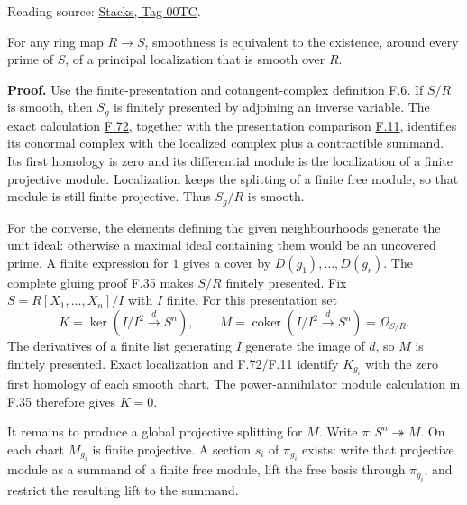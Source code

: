 \documentclass[11pt,a4paper,openany]{report}
\begin{document}
Reading source: \href{https://stacks.math.columbia.edu/tag/00TC}{Stacks, Tag 00TC}.

For any ring map \(R\to S\), smoothness is equivalent to the existence, around every prime of \(S\), of a principal localization that is smooth over \(R\).

\textbf{Proof.} Use the finite-presentation and cotangent-complex definition \hyperref[AG-RG-S05-algebra-definition-smooth]{F.6}. If \(S/R\) is smooth, then \(S_g\) is finitely presented by adjoining an inverse variable. The exact calculation \hyperref[AG-RG-S05-algebra-lemma-principal-localization-NL]{F.72}, together with the presentation comparison \hyperref[AG-RG-S05-algebra-lemma-NL-homotopy]{F.11}, identifies its conormal complex with the localized complex plus a contractible summand. Its first homology is zero and its differential module is the localization of a finite projective module. Localization keeps the splitting of a finite free module, so that module is still finite projective. Thus \(S_g/R\) is smooth.

For the converse, the elements defining the given neighbourhoods generate the unit ideal: otherwise a maximal ideal containing them would be an uncovered prime. A finite expression for \(1\) gives a cover by \(D(g_1),\ldots,D(g_r)\). The complete gluing proof \hyperref[AG-RG-S05-algebra-lemma-cover-upstairs]{F.35} makes \(S/R\) finitely presented. Fix \(S=R[X_1,\ldots,X_n]/I\) with \(I\) finite. For this presentation set \[K=\ker(I/I^2\xrightarrow{d}S^n),\qquad M=\operatorname{coker}(I/I^2\xrightarrow{d}S^n)=\Omega_{S/R}.\] The derivatives of a finite list generating \(I\) generate the image of \(d\), so \(M\) is finitely presented. Exact localization and F.72/F.11 identify \(K_{g_i}\) with the zero first homology of each smooth chart. The power-annihilator module calculation in F.35 therefore gives \(K=0\).

It remains to produce a global projective splitting for \(M\). Write \(\pi:S^n\twoheadrightarrow M\). On each chart \(M_{g_i}\) is finite projective. A section \(s_i\) of \(\pi_{g_i}\) exists: write that projective module as a summand of a finite free module, lift the free basis through \(\pi_{g_i}\), and restrict the resulting lift to the summand.
\end{document}
